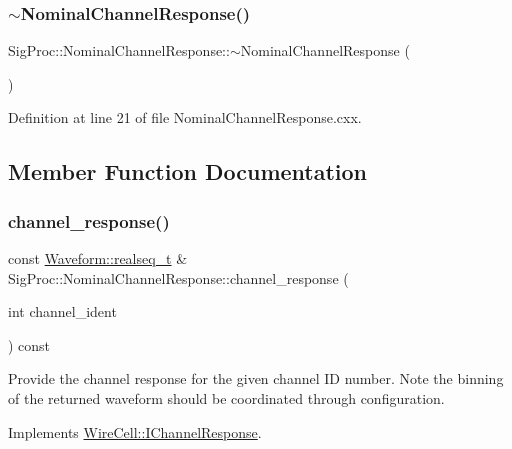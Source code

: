 \subsubsection{\texorpdfstring{$\sim$\+Nominal\+Channel\+Response()}{~NominalChannelResponse()}}
{\footnotesize\ttfamily Sig\+Proc\+::\+Nominal\+Channel\+Response\+::$\sim$\+Nominal\+Channel\+Response (\begin{DoxyParamCaption}{ }\end{DoxyParamCaption})\hspace{0.3cm}{\ttfamily [virtual]}}



Definition at line 21 of file Nominal\+Channel\+Response.\+cxx.



\subsection{Member Function Documentation}
\mbox{\label{class_wire_cell_1_1_sig_proc_1_1_nominal_channel_response_a494997d5336628959e8585fd8d5a509d}} 
\subsubsection{\texorpdfstring{channel\+\_\+response()}{channel\_response()}}
{\footnotesize\ttfamily const \hyperlink{namespace_wire_cell_1_1_waveform_a479175e541c8545e87cd8063b74b6956}{Waveform\+::realseq\+\_\+t} \& Sig\+Proc\+::\+Nominal\+Channel\+Response\+::channel\+\_\+response (\begin{DoxyParamCaption}\item[{int}]{channel\+\_\+ident }\end{DoxyParamCaption}) const\hspace{0.3cm}{\ttfamily [virtual]}}

Provide the channel response for the given channel ID number. Note the binning of the returned waveform should be coordinated through configuration. 

Implements \hyperlink{class_wire_cell_1_1_i_channel_response_aee79a65bc671678d529eca0e4792e10d}{Wire\+Cell\+::\+I\+Channel\+Response}.



